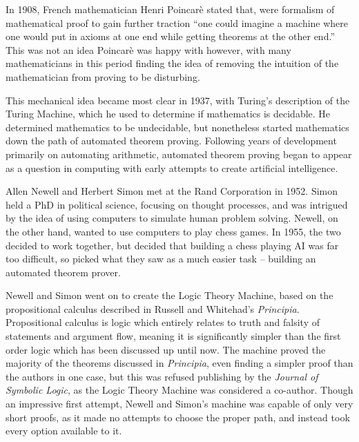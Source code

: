 In 1908, French mathematician Henri Poincar\`e stated that, were formalism of mathematical proof to gain further traction ``one could imagine a machine where one would put in axioms at one end while getting theorems at the other end.'' This was not an idea Poincar\`e was happy with however, with many mathematicians in this period finding the idea of removing the intuition of the mathematician from proving to be disturbing.

This mechanical idea became most clear in 1937, with Turing's description of the Turing Machine, which he used to determine if mathematics is decidable. He determined mathematics to be undecidable, but nonetheless started mathematics down the path of automated theorem proving. Following years of development primarily on automating arithmetic, automated theorem proving began to appear as a question in computing with early attempts to create artificial intelligence.

Allen Newell and Herbert Simon met at the Rand Corporation in 1952. Simon held a PhD in political science, focusing on thought processes, and was intrigued by the idea of using computers to simulate human problem solving. Newell, on the other hand, wanted to use computers to play chess games. In 1955, the two decided to work together, but decided that building a chess playing AI was far too difficult, so picked what they saw as a much easier task -- building an automated theorem prover.

Newell and Simon went on to create the Logic Theory Machine, based on the propositional calculus described in Russell and Whitehad's \textit{Principia}. Propositional calculus is logic which entirely relates to truth and falsity of statements and argument flow, meaning it is significantly simpler than the first order logic which has been discussed up until now. The machine proved the majority of the theorems discussed in \textit{Principia}, even finding a simpler proof than the authors in one case, but this was refused publishing by the \textit{Journal of Symbolic Logic}, as the Logic Theory Machine was considered a co-author. Though an impressive first attempt, Newell and Simon's machine was capable of only very short proofs, as it made no attempts to choose the proper path, and instead took every option available to it.

